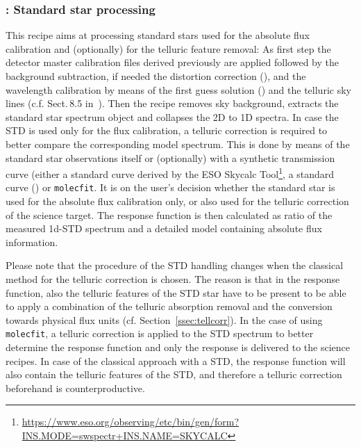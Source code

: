 \subsubsection{:  Standard star processing}\label{rec:metis_n_lss_std}
This recipe aims at processing standard stars used for the absolute flux calibration and (optionally) for the telluric feature removal: As first step the detector master calibration files derived previously are applied followed by the background subtraction, if needed the distortion correction (), and
the wavelength calibration by means of the first guess solution () and the telluric sky lines (c.f. Sect.\,8.5 in~\cite{DRLS}). Then the recipe removes sky background, extracts the standard star spectrum object and collapses the 2D to 1D spectra. In case the \ac{STD} is used only for the flux calibration, a telluric correction is required to better compare the corresponding model spectrum. This is done by means of the standard star observations itself or (optionally) with a synthetic transmission curve (either a standard curve derived by the ESO Skycalc Tool\footnote{\url{https://www.eso.org/observing/etc/bin/gen/form?INS.MODE=swspectr+INS.NAME=SKYCALC}}, a standard curve () or \texttt{molecfit}. It is on the user's decision whether the standard star is used for the absolute flux calibration only, or also used for the telluric correction of the science target. The response function is then calculated as ratio of the measured 1d-\ac{STD} spectrum and a detailed model containing absolute flux information.

Please note that the procedure of the \ac{STD} handling changes when the classical method for the telluric correction is chosen. The reason is that in the response function, also the telluric features of the \ac{STD} star have to be present to be able to apply a combination of the telluric absorption removal and the conversion towards physical flux units (cf. Section~\ref{ssec:tellcorr}). In the case of using \texttt{molecfit}, a telluric correction is applied to the \ac{STD} spectrum to better determine the response function and only the response is delivered to the science recipes. In case of the classical approach with a \ac{STD}, the response function will also contain the telluric features of the \ac{STD}, and therefore a telluric correction beforehand is counterproductive.\\

